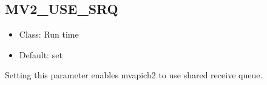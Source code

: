 % 
% 
% 


\subsection{MV2\_USE\_SRQ}
\begin{itemize}
    \item Class: Run time
    \item Default: set
\end{itemize}
Setting this parameter enables mvapich2 to use shared receive queue.

% 

